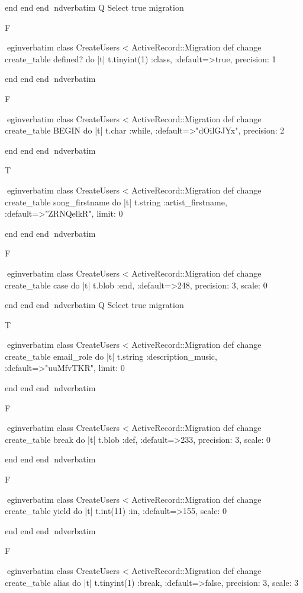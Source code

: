     end 
  end 
end
nd{verbatim}
Q
 Select true migration

F

egin{verbatim}
 class CreateUsers < ActiveRecord::Migration 
  def change 
    create_table defined? do |t| 
      t.tinyint(1) :class, :default=>true, precision: 1
    
    end 
  end 
end
nd{verbatim}

F

egin{verbatim}
 class CreateUsers < ActiveRecord::Migration 
  def change 
    create_table BEGIN do |t| 
      t.char :while, :default=>"dOilGJYx", precision: 2
    
    end 
  end 
end
nd{verbatim}

T

egin{verbatim}
 class CreateUsers < ActiveRecord::Migration 
  def change 
    create_table song_firstname do |t| 
      t.string :artist_firstname, :default=>"ZRNQelkR", limit: 0
    
    end 
  end 
end
nd{verbatim}

F

egin{verbatim}
 class CreateUsers < ActiveRecord::Migration 
  def change 
    create_table case do |t| 
      t.blob :end, :default=>248, precision: 3, scale: 0
    
    end 
  end 
end
nd{verbatim}
Q
 Select true migration

T

egin{verbatim}
 class CreateUsers < ActiveRecord::Migration 
  def change 
    create_table email_role do |t| 
      t.string :description_music, :default=>"uuMfvTKR", limit: 0
    
    end 
  end 
end
nd{verbatim}

F

egin{verbatim}
 class CreateUsers < ActiveRecord::Migration 
  def change 
    create_table break do |t| 
      t.blob :def, :default=>233, precision: 3, scale: 0
    
    end 
  end 
end
nd{verbatim}

F

egin{verbatim}
 class CreateUsers < ActiveRecord::Migration 
  def change 
    create_table yield do |t| 
      t.int(11) :in, :default=>155, scale: 0
    
    end 
  end 
end
nd{verbatim}

F

egin{verbatim}
 class CreateUsers < ActiveRecord::Migration 
  def change 
    create_table alias do |t| 
      t.tinyint(1) :break, :default=>false, precision: 3, scale: 3
    
